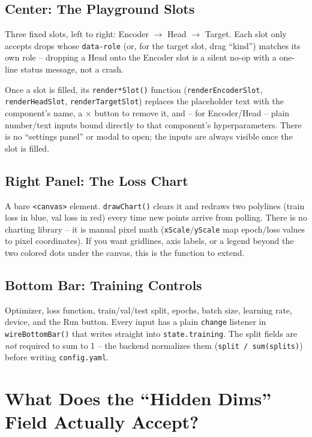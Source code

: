 \documentclass[11pt]{article}
\begin{document}
\subsection{Center: The Playground Slots}
Three fixed slots, left to right: Encoder $\to$ Head $\to$ Target. Each slot
only accepts drops whose \lstinline{data-role} (or, for the target slot, drag
``kind'') matches its own role -- dropping a Head onto the Encoder slot is a
silent no-op with a one-line status message, not a crash.

Once a slot is filled, its \lstinline{render*Slot()} function
(\lstinline{renderEncoderSlot}, \lstinline{renderHeadSlot},
\lstinline{renderTargetSlot}) replaces the placeholder text with the
component's name, a $\times$ button to remove it, and -- for
Encoder/Head -- plain number/text inputs bound directly to that component's
hyperparameters. There is no ``settings panel'' or modal to open; the inputs
are always visible once the slot is filled.

\subsection{Right Panel: The Loss Chart}
A bare \lstinline{<canvas>} element. \lstinline{drawChart()} clears it and
redraws two polylines (train loss in blue, val loss in red) every time new
points arrive from polling. There is no charting library -- it is manual
pixel math (\lstinline{xScale}/\lstinline{yScale} map epoch/loss values to
pixel coordinates). If you want gridlines, axis labels, or a legend beyond
the two colored dots under the canvas, this is the function to extend.

\subsection{Bottom Bar: Training Controls}
Optimizer, loss function, train/val/test split, epochs, batch size, learning
rate, device, and the Run button. Every input has a plain
\lstinline{change} listener in \lstinline{wireBottomBar()} that writes
straight into \lstinline{state.training}. The split fields are \emph{not}
required to sum to 1 -- the backend normalizes them
(\lstinline{split / sum(splits)}) before writing \lstinline{config.yaml}.

\section{What Does the ``Hidden Dims'' Field Actually Accept?}
\label{sec:hidden-dims}
\end{document}
